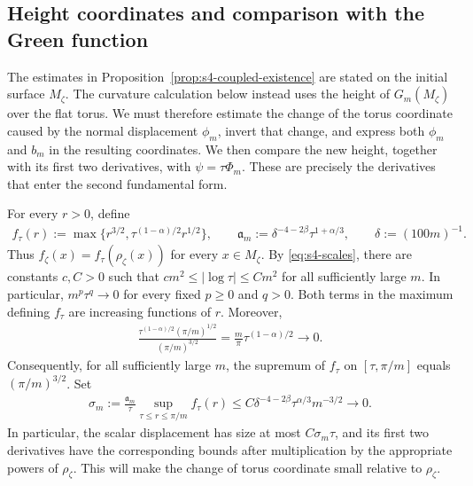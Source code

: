 \documentclass[a4paper,11pt,oneside,reqno]{amsart}
\numberwithin{equation}{section}
\theoremstyle{definition}
\begin{document}
\subsection{Height coordinates and comparison with the Green function}

The estimates in Proposition~\ref{prop:s4-coupled-existence}
are stated on the initial surface $M_\zeta$. The curvature
calculation below instead uses the height of
$G_m(M_\zeta)$ over the flat torus. We must therefore
estimate the change of the torus coordinate caused by the
normal displacement $\phi_m$, invert that change, and express
both $\phi_m$ and $b_m$ in the resulting coordinates.
We then compare the new height, together with its first two
derivatives, with $\psi=\tau\Phi_m$. These are precisely the
derivatives that enter the second fundamental form.

For every $r>0$, define
%
\begin{align*}
    f_\tau(r):=\max\{r^{3/2},
    \tau^{(1-\alpha)/2}r^{1/2}\},\qquad
    \mathfrak a_m:=\delta^{-4-2\beta}\tau^{1+\alpha/3},
    \qquad \delta:=(100m)^{-1}.
\end{align*}
%
Thus $f_\zeta(x)=f_\tau(\rho_\zeta(x))$ for every
$x\in M_\zeta$. By \eqref{eq:s4-scales}, there are
constants $c,C>0$ such that
$cm^2\leq|\log\tau|\leq Cm^2$ for all sufficiently large
$m$. In particular, $m^p\tau^q\to0$ for every fixed
$p\geq0$ and $q>0$.
Both terms in the maximum defining $f_\tau$ are increasing
functions of $r$. Moreover,
%
\begin{align*}
    \frac{\tau^{(1-\alpha)/2}(\pi/m)^{1/2}}
         {(\pi/m)^{3/2}}
    =\frac{m}{\pi}\tau^{(1-\alpha)/2}\rightarrow0.
\end{align*}
%
Consequently, for all sufficiently large $m$, the supremum
of $f_\tau$ on $[\tau,\pi/m]$ equals $(\pi/m)^{3/2}$.
Set
%
\begin{align}
    \label{eq:s4-curvature-scalar-smallness}
    \sigma_m:=\frac{\mathfrak a_m}{\tau}
    \sup_{\tau\leq r\leq\pi/m}f_\tau(r)
    \leq C\delta^{-4-2\beta}\tau^{\alpha/3}m^{-3/2}
    \rightarrow0.
\end{align}
%
In particular, the scalar displacement has size at most
$C\sigma_m\tau$, and its first two derivatives have the
corresponding bounds after multiplication by the appropriate
powers of $\rho_\zeta$. This will make the change of torus
coordinate small relative to $\rho_\zeta$.
\end{document}
